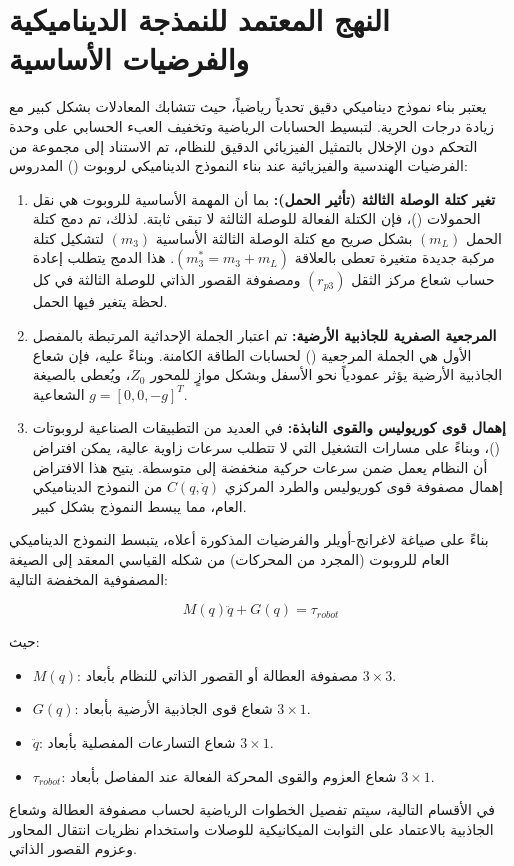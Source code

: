 \section{النهج المعتمد للنمذجة الديناميكية والفرضيات الأساسية}
\label{sec:dynamic_approach}

يعتبر بناء نموذج ديناميكي دقيق تحدياً رياضياً، حيث تتشابك المعادلات بشكل كبير مع زيادة درجات الحرية. لتبسيط الحسابات الرياضية وتخفيف العبء الحسابي على وحدة التحكم دون الإخلال بالتمثيل الفيزيائي الدقيق للنظام، تم الاستناد إلى مجموعة من الفرضيات الهندسية والفيزيائية عند بناء النموذج الديناميكي لروبوت () المدروس:

\begin{enumerate}
    \item \textbf{تغير كتلة الوصلة الثالثة (تأثير الحمل):}
    بما أن المهمة الأساسية للروبوت هي نقل الحمولات ()، فإن الكتلة الفعالة للوصلة الثالثة لا تبقى ثابتة. لذلك، تم دمج كتلة الحمل $(m_L)$ بشكل صريح مع كتلة الوصلة الثالثة الأساسية $(m_3)$ لتشكيل كتلة مركبة جديدة متغيرة تعطى بالعلاقة $(m_3^* = m_3 + m_L)$. هذا الدمج يتطلب إعادة حساب شعاع مركز الثقل $(r_{p3})$ ومصفوفة القصور الذاتي للوصلة الثالثة في كل لحظة يتغير فيها الحمل.
    
    \item \textbf{المرجعية الصفرية للجاذبية الأرضية:}
    تم اعتبار الجملة الإحداثية المرتبطة بالمفصل الأول  هي الجملة المرجعية () لحسابات الطاقة الكامنة. وبناءً عليه، فإن شعاع الجاذبية الأرضية يؤثر عمودياً نحو الأسفل وبشكل موازٍ للمحور $Z_0$، ويُعطى بالصيغة الشعاعية $g = [0, 0, -g]^T$.
    
    \item \textbf{إهمال قوى كوريوليس والقوى النابذة:}
    في العديد من التطبيقات الصناعية لروبوتات ()، وبناءً على مسارات التشغيل التي لا تتطلب سرعات زاوية عالية، يمكن افتراض أن النظام يعمل ضمن سرعات حركية منخفضة إلى متوسطة. يتيح هذا الافتراض إهمال مصفوفة قوى كوريوليس والطرد المركزي $C(q, \dot{q})$ من النموذج الديناميكي العام، مما يبسط النموذج بشكل كبير.
\end{enumerate}

بناءً على صياغة لاغرانج-أويلر والفرضيات المذكورة أعلاه، يتبسط النموذج الديناميكي العام للروبوت (المجرد من المحركات) من شكله القياسي المعقد إلى الصيغة المصفوفية المخفضة التالية:

\begin{equation}
M(q)\ddot{q} + G(q) = \tau_{robot}
\label{eq:simplified_dynamic_model}
\end{equation}

حيث:
\begin{itemize}
    \item $M(q)$: مصفوفة العطالة أو القصور الذاتي للنظام بأبعاد $3 \times 3$.
    \item $G(q)$: شعاع قوى الجاذبية الأرضية بأبعاد $3 \times 1$.
    \item $\ddot{q}$: شعاع التسارعات المفصلية بأبعاد $3 \times 1$.
    \item $\tau_{robot}$: شعاع العزوم والقوى المحركة الفعالة عند المفاصل بأبعاد $3 \times 1$.
\end{itemize}

في الأقسام التالية، سيتم تفصيل الخطوات الرياضية لحساب مصفوفة العطالة وشعاع الجاذبية بالاعتماد على الثوابت الميكانيكية للوصلات واستخدام نظريات انتقال المحاور وعزوم القصور الذاتي.
